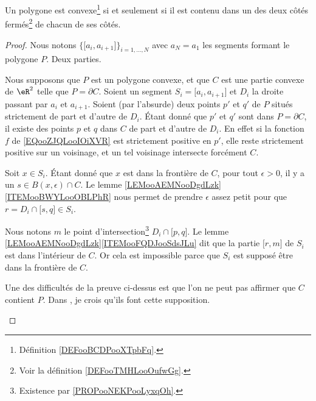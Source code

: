 \begin{proposition}       \label{PROPooFYRMooTqVDEm}
	Un polygone est convexe\footnote{Définition \ref{DEFooBCDPooXTpbFq}.} si et seulement si il est contenu dans un des deux côtés fermés\footnote{Voir la définition \ref{DEFooTMHLooOufwGg}.} de chacun de ses côtés.
\end{proposition}

\begin{proof}
	Nous notons \(\{ \mathopen[ a_i,a_{i+1}\mathclose] \}_{i=1,\ldots,N}\) avec \( a_{N}=a_1\) les segments formant le polygone \( P\). Deux parties.
	\begin{subproof}
		\spitem[\( \Rightarrow\)]
		Nous supposons que \( P\) est un polygone convexe, et que \( C\) est une partie convexe de \( \eR^2\) telle que \( P=\partial C\). Soient un segment \( S_i=\mathopen[ a_i,a_{i+1}\mathclose]\) et \( D_i\) la droite passant par \( a_i\) et \( a_{i+1}\). Soient (par l'absurde) deux points \( p'\) et \( q'\) de \( P\) situés strictement de part et d'autre de \( D_i\). Étant donné que \( p'\) et \( q'\) sont dans \( P=\partial C\), il existe des points \( p\) et \( q\) dans \( C\) de part et d'autre de \( D_i\). En effet si la fonction \( f\) de \eqref{EQooZJQLooIOiXVR} est strictement positive en \( p'\), elle reste strictement positive sur un voisinage, et un tel voisinage intersecte forcément \( C\).

		Soit \( x\in S_i\). Étant donné que \( x\) est dans la frontière de \( C\), pour tout \( \epsilon>0\), il y a un \( s\in B(x,\epsilon)\cap C\). Le lemme \ref{LEMooAEMNooDgdLzk}\ref{ITEMooBWYLooOBLPhR} nous permet de prendre \( \epsilon\) assez petit pour que \( r=D_i\cap \mathopen[ s,q\mathclose]\in S_i\).

		Nous notons \( m\) le point d'intersection\footnote{Existence par \ref{PROPooNEKPooLyxqOh}.} \( D_i\cap\mathopen[ p,q\mathclose]\). Le lemme \ref{LEMooAEMNooDgdLzk}\ref{ITEMooFQDJooSdsJLu} dit que la partie \( \mathopen[ r,m\mathclose]\) de \( S_i\) est dans l'intérieur de \( C\). Or cela est impossible parce que \( S_i\) est supposé être dans la frontière de \( C\).

		\spitem[Remarque]
		Une des difficultés de la preuve ci-dessus est que l'on ne peut pas affirmer que \( C\) contient \( P\). Dans \cite{BIBooPEXAooOitXGM}, je crois qu'ils font cette supposition.


\end{subproof}
\end{proof}
